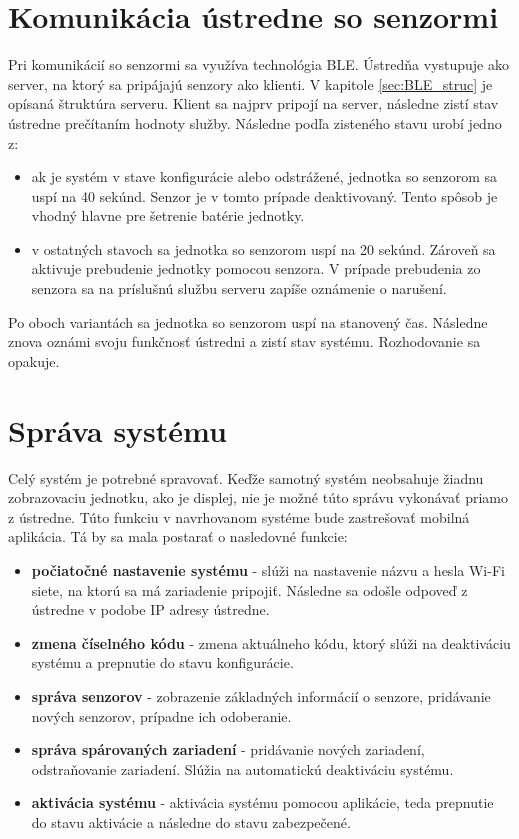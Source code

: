 \section{Komunikácia ústredne so senzormi}\label{sec:komunikacia}

Pri komunikácií so senzormi sa využíva technológia BLE. Ústredňa vystupuje ako server, na ktorý sa pripájajú senzory ako klienti. V kapitole \ref{sec:BLE_struc} je opísaná štruktúra serveru. Klient sa najprv pripojí na server, následne zistí stav ústredne prečítaním hodnoty služby. Následne podľa zisteného stavu urobí jedno z:
\begin{itemize}
    \item ak je systém v stave konfigurácie alebo odstrážené, jednotka so senzorom sa uspí na 40 sekúnd. Senzor je v tomto prípade deaktivovaný. Tento spôsob je vhodný hlavne pre šetrenie batérie jednotky.
    \item v ostatných stavoch sa jednotka so senzorom uspí na 20 sekúnd. Zároveň sa aktivuje prebudenie jednotky pomocou senzora. V prípade prebudenia zo senzora sa na príslušnú službu serveru zapíše oznámenie o narušení.
\end{itemize}
Po oboch variantách sa jednotka so senzorom uspí na stanovený čas. Následne znova oznámi svoju funkčnosť ústredni a zistí stav systému. Rozhodovanie sa opakuje.

\section{Správa systému}

Celý systém je potrebné spravovať. Keďže samotný systém neobsahuje žiadnu zobrazovaciu jednotku, ako je displej, nie je možné túto správu vykonávať priamo z ústredne. Túto funkciu v navrhovanom systéme bude zastrešovať mobilná aplikácia. Tá by sa mala postarať o nasledovné funkcie:
\begin{itemize}
    \item \textbf{počiatočné nastavenie systému} - slúži na nastavenie názvu a hesla Wi-Fi siete, na ktorú sa má zariadenie pripojiť. Následne sa odošle odpoveď z ústredne v podobe IP adresy ústredne.
    \item \textbf{zmena číselného kódu} - zmena aktuálneho kódu, ktorý slúži na deaktiváciu systému a prepnutie do stavu konfigurácie.
    \item \textbf{správa senzorov} - zobrazenie základných informácií o senzore, pridávanie nových senzorov, prípadne ich odoberanie.
    \item \textbf{správa spárovaných zariadení} - pridávanie nových zariadení, odstraňovanie zariadení. Slúžia na automatickú deaktiváciu systému.
    \item \textbf{aktivácia systému} - aktivácia systému pomocou aplikácie, teda prepnutie do stavu aktivácie a následne do stavu zabezpečené.
\end{itemize}

